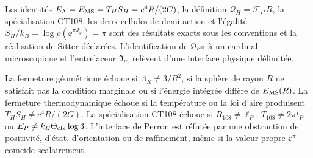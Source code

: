 \begin{proofstatusbox}
Les identités \(E_\Lambda=E_{\rm MS}=T_HS_H=c^4R/(2G)\), la définition \(\mathcal Q_H=\mathscr F_P\,R\), la spécialisation CT108, les deux cellules de demi-action et l’égalité \(S_H/k_B=\log\rho(\ee^{\pi J_\varphi})=\pi\) sont des résultats exacts sous les conventions et la réalisation de Sitter déclarées. L’identification de \(\Omega_{\rm eff}\) à un cardinal microscopique et l’entrelaceur \(\mathfrak I_m\) relèvent d’une interface physique délimitée.
\end{proofstatusbox}


\begin{falsifierbox}
La fermeture géométrique échoue si \(\Lambda_R\ne3/R^2\), si la sphère de rayon \(R\) ne satisfait pas la condition marginale ou si l’énergie intégrée diffère de \(E_{\rm MS}(R)\). La fermeture thermodynamique échoue si la température ou la loi d’aire produisent \(T_HS_H\ne c^4R/(2G)\). La spécialisation CT108 échoue si \(R_{108}\ne\ell_P\), \(T_{108}\ne2\pi t_P\) ou \(E_P\ne k_B\Theta_{\rm clk}\log3\). L’interface de Perron est réfutée par une obstruction de positivité, d’état, d’orientation ou de raffinement, même si la valeur propre \(\ee^\pi\) coïncide scalairement.
\end{falsifierbox}
